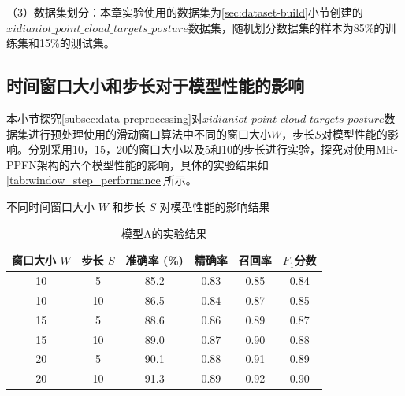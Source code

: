 （3）数据集划分：本章实验使用的数据集为\eqref{sec:dataset-build}小节创建的$xidianiot\_point\_cloud\_targets\_posture$数据集，随机划分数据集的样本为85\%的训练集和15\%的测试集。

\subsection{时间窗口大小和步长对于模型性能的影响}
本小节探究\eqref{subsec:data preprocessing}对$xidianiot\_point\_cloud\_targets\_posture$数据集进行预处理使用的滑动窗口算法中不同的窗口大小$W$，步长$S$对模型性能的影响。分别采用10，15，20的窗口大小以及5和10的步长进行实验，探究对使用MR-PPFN架构的六个模型性能的影响，具体的实验结果如\eqref{tab:window_step_performance}所示。

\begin{table}[htbp]
    \caption{不同时间窗口大小 $W$ 和步长 $S$ 对模型性能的影响结果}
    \label{tab:window_step_performance}
    \centering

    \begin{subtable}{\linewidth}
        \centering
        \caption{模型A的实验结果}
        \begin{tabular}{cc|cccc}
            \toprule
            窗口大小 $W$ & 步长 $S$ & 准确率 (\%) & 精确率 & 召回率 & $F_1$分数 \\
            \midrule
            10 & 5 & 85.2 & 0.83 & 0.85 & 0.84 \\
            10 & 10 & 86.5 & 0.84 & 0.87 & 0.85 \\
            15 & 5 & 88.6 & 0.86 & 0.89 & 0.87 \\
            15 & 10 & 89.0 & 0.87 & 0.90 & 0.88 \\
            20 & 5 & 90.1 & 0.88 & 0.91 & 0.89 \\
            20 & 10 & 91.3 & 0.89 & 0.92 & 0.90 \\
            \bottomrule
        \end{tabular}
        \label{tab:modelA_performance}
    \end{subtable}

    \vspace{0.4cm} 


\end{table}
